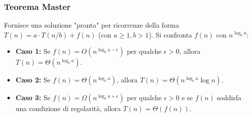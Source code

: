 \subsubsection{Teorema Master}
Fornisce una soluzione "pronta" per ricorrenze della forma $T(n) = a \cdot T(n/b) + f(n)$ (con $a \ge 1, b > 1$). Si confronta $f(n)$ con $n^{\log_b a}$:
\begin{itemize}
    \item \textbf{Caso 1:} Se $f(n) = O(n^{\log_b a - \epsilon})$ per qualche $\epsilon > 0$, allora $T(n) = \Theta(n^{\log_b a})$.
    \item \textbf{Caso 2:} Se $f(n) = \Theta(n^{\log_b a})$, allora $T(n) = \Theta(n^{\log_b a} \log n)$.
    \item \textbf{Caso 3:} Se $f(n) = \Omega(n^{\log_b a + \epsilon})$ per qualche $\epsilon > 0$ e se $f(n)$ soddisfa una condizione di regolarità, allora $T(n) = \Theta(f(n))$.
\end{itemize}